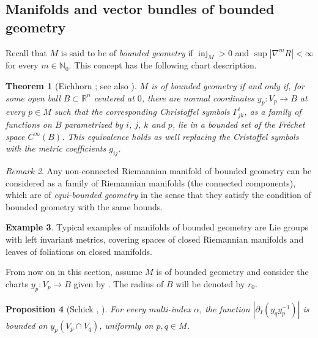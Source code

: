 \documentclass{memo-l}
\theoremstyle{plain}
\newtheorem{thm}{Theorem}[section]
\newtheorem{prop}[thm]{Proposition}
\theoremstyle{definition}
\newtheorem{ex}[thm]{Example}
\theoremstyle{remark}
\newtheorem{rem}[thm]{Remark}
\newcommand{\N}{\mathbb{N}}
\newcommand{\R}{\mathbb{R}}
\newcommand{\inj}{\operatorname{inj}}
\numberwithin{section}{chapter}
\numberwithin{equation}{section}%
\begin{document}
\subsection{Manifolds and vector bundles of bounded geometry}\label{ss: mfds and vector bdls of bd geom}

Recall that $M$ is said to be of \emph{bounded geometry}  if $\inj_M>0$ and $\sup|\nabla^mR|<\infty$ for every $m\in\N_0$. This concept has the following chart description. 

\begin{thm}[Eichhorn \cite{Eichhorn1991}; see also \cite{Roe1988I,Schick1996,Schick2001}]\label{t: mfd of bd geom}
$M$ is of bounded geometry if and only if, for some open ball $B\subset\R^n$ centered at $0$, there are normal coordinates $y_p:V_p\to B$ at every $p\in M$ such that the corresponding Christoffel symbols $\Gamma^i_{jk}$, as a family of functions on $B$ parametrized by $i$, $j$, $k$ and $p$, lie in a bounded set of the Fr\'echet space $C^\infty(B)$. This equivalence holds as well replacing the Cristoffel symbols with the metric coefficients $g_{ij}$.
\end{thm}

\begin{rem}\label{r: equi-bounded geometry}
Any non-connected Riemannian manifold of bounded geometry can be considered as a family of Riemannian manifolds (the connected components), which are of \emph{equi-bounded geometry} in the sense that they satisfy the condition of bounded geometry with the same bounds.
\end{rem}

\begin{ex}\label{ex: mfds of bd geom}
Typical examples of manifolds of bounded geometry are Lie groups with left invariant metrics, covering spaces of closed Riemannian manifolds and leaves of foliations on closed manifolds.
\end{ex}

From now on in this section, assume $M$ is of bounded geometry and consider the charts $y_p:V_p\to B$ given by . The radius of $B$ will be denoted by $r_0$. 

\begin{prop}[{Schick \cite[Theorem~A.22]{Schick1996}, \cite[Proposition~3.3]{Schick2001}}]\label{p: |partial_I(y_q y_p^-1)|}
For every multi-index $\alpha$, the function $|\partial_I(y_qy_p^{-1})|$ is bounded on $y_p(V_p\cap V_q)$, uniformly on $p,q\in M$.
\end{prop}
\end{document}
